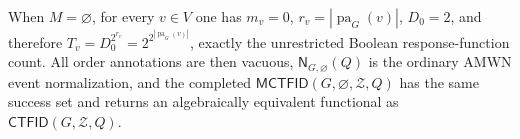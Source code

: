 When \(M=\varnothing\), for every \(v\in V\) one has \(m_v=0\), \(r_v=|\operatorname{pa}_G(v)|\), \(D_0=2\), and therefore \(T_v=D_0^{2^{r_v}}=2^{2^{|\operatorname{pa}_G(v)|}}\), exactly the unrestricted Boolean response-function count. All order annotations are then vacuous, \(\mathsf N_{G,\varnothing}(Q)\) is the ordinary AMWN event normalization, and the completed \(\mathsf{MCTFID}(G,\varnothing,\mathcal Z,Q)\) has the same success set and returns an algebraically equivalent functional as \(\mathsf{CTFID}(G,\mathcal Z,Q)\).
